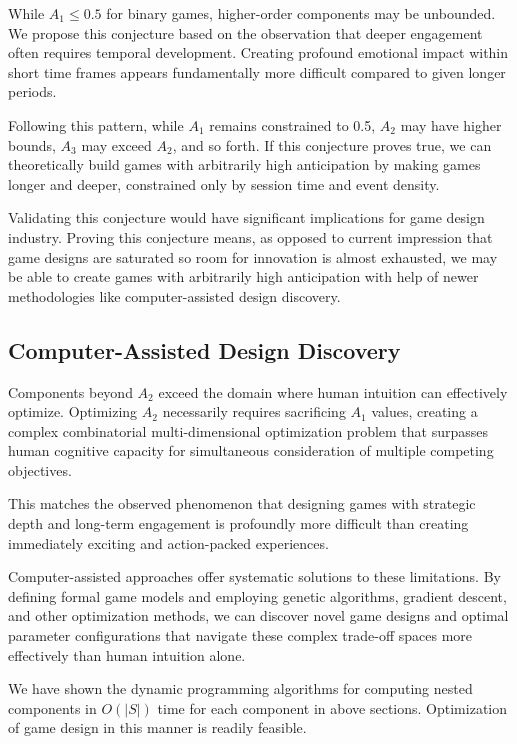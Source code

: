 \documentclass{article}
\begin{document}
While $A_1 \leq 0.5$ for binary games, higher-order components may be unbounded. We propose this conjecture based on the observation that deeper engagement often requires temporal development. Creating profound emotional impact within short time frames appears fundamentally more difficult compared to given longer periods.

Following this pattern, while $A_1$ remains constrained to 0.5, $A_2$ may have higher bounds, $A_3$ may exceed $A_2$, and so forth. If this conjecture proves true, we can theoretically build games with arbitrarily high anticipation by making games longer and deeper, constrained only by session time and event density.

Validating this conjecture would have significant implications for game design industry.
Proving this conjecture means, as opposed to current impression that game designs are saturated so room for innovation is almost exhausted, we may be able to create games with arbitrarily high anticipation with help of newer methodologies like computer-assisted design discovery.

\subsection{Computer-Assisted Design Discovery}

Components beyond $A_2$ exceed the domain where human intuition can effectively optimize. Optimizing $A_2$ necessarily requires sacrificing $A_1$ values, creating a complex combinatorial multi-dimensional optimization problem that surpasses human cognitive capacity for simultaneous consideration of multiple competing objectives.

This matches the observed phenomenon that designing games with strategic depth and long-term engagement is profoundly more difficult than creating immediately exciting and action-packed experiences.

Computer-assisted approaches offer systematic solutions to these limitations. By defining formal game models and employing genetic algorithms, gradient descent, and other optimization methods, we can discover novel game designs and optimal parameter configurations that navigate these complex trade-off spaces more effectively than human intuition alone.

We have shown the dynamic programming algorithms for computing nested components in $O(|S|)$ time for each component in above sections. Optimization of game design in this manner is readily feasible.
\end{document}

